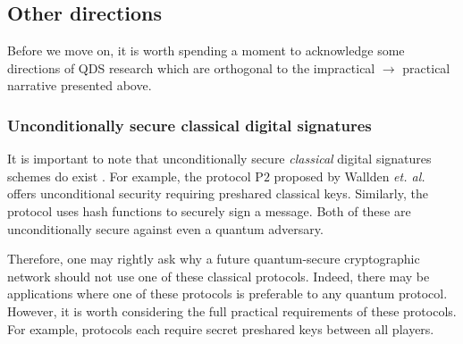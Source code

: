 \subsection{Other directions}\label{section:other_directions}


%
%

Before we move on, it is worth spending a moment to acknowledge some directions of QDS research which are orthogonal to the impractical $\rightarrow$ practical narrative presented above.


\subsubsection*{Unconditionally secure classical digital signatures}
It is important to note that unconditionally secure \emph{classical} digital signatures schemes do exist \cite{Wallden2015, Amiri2016a, Hanaoka2000}. For example, the protocol P$2$ proposed by Wallden \emph{et. al.} \cite{Wallden2015} offers unconditional security requiring preshared classical keys. Similarly, the protocol \cite{Amiri2016a} uses hash functions to securely sign a message. %
Both of these are unconditionally secure against even a quantum adversary.

Therefore, one may rightly ask why a future quantum-secure cryptographic network should not use one of these classical protocols. Indeed, there may be applications where one of these protocols is preferable to any quantum protocol. However, it is worth considering the full practical requirements of these protocols. For example, protocols \cite{Wallden2015, Amiri2016a} each require secret preshared keys between all players. 

